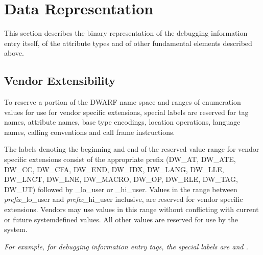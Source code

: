 \chapter{Data Representation}
\label{datarep:datarepresentation}

This section describes the binary representation of the
debugging information entry itself, of the attribute types
and of other fundamental elements described above.

\section{Vendor Extensibility}
\label{datarep:vendorextensibility}

To 
reserve a portion of the DWARF name space and ranges of
enumeration values for use for vendor specific extensions,
special labels are reserved for tag names, attribute names,
base type encodings, location operations, language names,
calling conventions and call frame instructions.

The labels denoting the beginning and end of the 
\hypertarget{chap:DWXXXlohiuser}{reserved value range}
for vendor specific extensions consist of the
appropriate prefix 
(\DWATlouserMARK{}\DWAThiuserMARK{}DW\_AT, 
\DWATElouserMARK{}\DWATEhiuserMARK{}DW\_ATE, 
\DWCClouserMARK{}\DWCChiuserMARK{}DW\_CC, 
\DWCFAlouserMARK{}\DWCFAhiuserMARK{}DW\_CFA, 
\DWENDlouserMARK{}\DWENDhiuserMARK{}DW\_END, 
\DWIDXlouserMARK{}\DWIDXhiuserMARK{}DW\_IDX, 
\DWLANGlouserMARK{}\DWLANGhiuserMARK{}DW\_LANG,
\bb
\DWLLElouserMARK{}\DWLLEhiuserMARK{}DW\_LLE,
\eb 
\DWLNCTlouserMARK{}\DWLNCThiuserMARK{}DW\_LNCT, 
\DWLNElouserMARK{}\DWLNEhiuserMARK{}DW\_LNE, 
\DWMACROlouserMARK{}\DWMACROhiuserMARK{}DW\_MACRO,
\DWOPlouserMARK{}\DWOPhiuserMARK{}DW\_OP,
\bb
\DWRLElouserMARK{}\DWRLEhiuserMARK{}DW\_RLE,
\eb
\DWTAGlouserMARK{}\DWTAGhiuserMARK{}DW\_TAG,
\DWUTlouserMARK{}\DWUThiuserMARK{}DW\_UT)
followed by \_lo\_user or \_hi\_user. 
Values in the  range between \textit{prefix}\_lo\_user 
and \textit{prefix}\_hi\_user inclusive,
are reserved for vendor specific extensions. Vendors may
use values in this range without conflicting with current or
future system\dash defined values. All other values are reserved
for use by the system.

\textit{For example, for debugging information entry
tags, the special labels are \DWTAGlouserNAME{} and \DWTAGhiuserNAME.}

